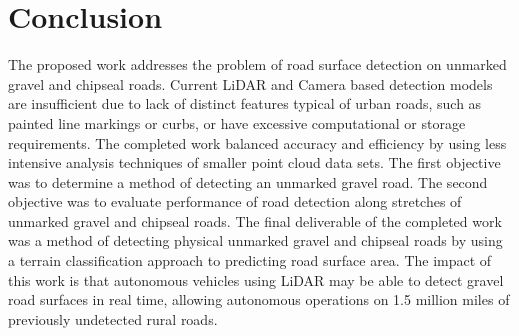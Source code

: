 \documentclass[numbered,pdftex]{ohio-etd}
\begin{document}
{{{	}
		
} %


\chapter{Conclusion}

{
	
	{The proposed work addresses the problem of road surface detection on unmarked gravel and chipseal roads. Current LiDAR and Camera based detection models are insufficient due to lack of distinct features typical of urban roads, such as painted line markings or curbs, or have excessive computational or storage requirements. The completed work balanced accuracy and efficiency by using less intensive analysis techniques of smaller point cloud data sets. The first objective was to determine a method of detecting an unmarked gravel road. The second objective was to evaluate performance of road detection along stretches of unmarked gravel and chipseal roads. The final deliverable of the completed work was a method of detecting physical unmarked gravel and chipseal roads by using a terrain classification approach to predicting road surface area. The impact of this work is that autonomous vehicles using LiDAR may be able to detect gravel road surfaces in real time, allowing autonomous operations on 1.5 million miles of previously undetected rural roads.}

}


%
%	
%	
%	
%	
%	
		
%			
%			
%			
%			
%				
		
	} %
\end{document}
